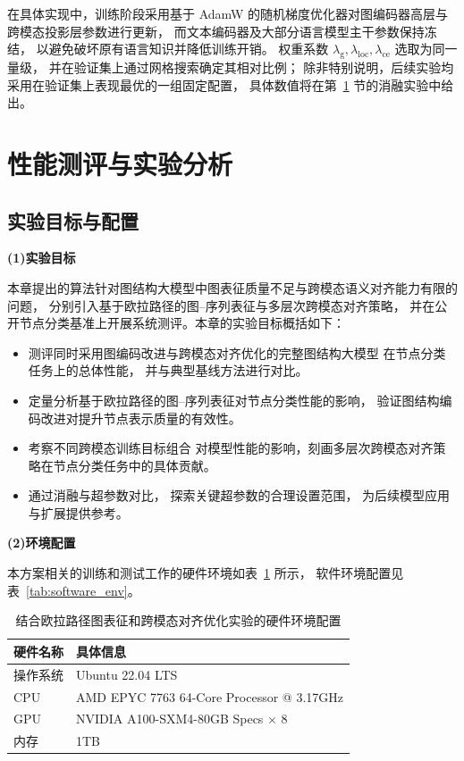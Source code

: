 在具体实现中，训练阶段采用基于 AdamW 的随机梯度优化器对图编码器高层与跨模态投影层参数进行更新，
而文本编码器及大部分语言模型主干参数保持冻结，
以避免破坏原有语言知识并降低训练开销。
权重系数 $\lambda_{\mathrm{g}},\lambda_{\mathrm{loc}},\lambda_{\mathrm{ce}}$ 选取为同一量级，
并在验证集上通过网格搜索确定其相对比例；
除非特别说明，后续实验均采用在验证集上表现最优的一组固定配置，
具体数值将在第~\ref{sec:three_total_Experiment} 节的消融实验中给出。

\section{性能测评与实验分析}
\label{sec:three_total_Experiment}
\subsection{实验目标与配置}
\label{subsec:Experiment_setup}
\textbf{(1)实验目标}

本章提出的算法针对图结构大模型中图表征质量不足与跨模态语义对齐能力有限的问题，
分别引入基于欧拉路径的图--序列表征与多层次跨模态对齐策略，
并在公开节点分类基准上开展系统测评。本章的实验目标概括如下：

\begin{itemize}
  \item 测评同时采用图编码改进与跨模态对齐优化的完整图结构大模型
  在节点分类任务上的总体性能，
  并与典型基线方法进行对比。

  \item 定量分析基于欧拉路径的图--序列表征对节点分类性能的影响，
  验证图结构编码改进对提升节点表示质量的有效性。

  \item 考察不同跨模态训练目标组合
  对模型性能的影响，刻画多层次跨模态对齐策略在节点分类任务中的具体贡献。

  \item 通过消融与超参数对比，
  探索关键超参数的合理设置范围，
  为后续模型应用与扩展提供参考。
\end{itemize}

\textbf{(2)环境配置}

本方案相关的训练和测试工作的硬件环境如表~\ref{tab:hardware_env} 所示，
软件环境配置见表~\ref{tab:software_env}。
\begin{table}[htbp]
  \centering
  \caption{结合欧拉路径图表征和跨模态对齐优化实验的硬件环境配置}
  \label{tab:hardware_env}
  \begin{tabularx}{0.9\textwidth}
    {>{\centering\arraybackslash}p{}|>{\centering\arraybackslash}X}

    \hline
    硬件名称 & 具体信息 \\ \hline
    操作系统 & Ubuntu 22.04 LTS \\ 
    CPU      & AMD EPYC 7763 64-Core Processor @ 3.17GHz \\
    GPU      & NVIDIA A100\mbox{-}SXM4\mbox{-}80GB Specs $\times$ 8 \\ 
    内存     & 1TB \\ \hline
  \end{tabularx}
\end{table}



